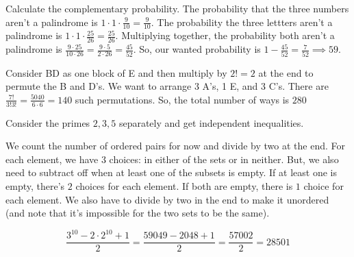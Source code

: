 \documentclass[11pt]{article}
\begin{document}
\begin{sol}
Calculate the complementary probability. The probability that the three numbers aren't a palindrome is $1\cdot 1\cdot \frac{9}{10}=\frac{9}{10}$. The probability the three lettters aren't a palindrome is $1\cdot 1\cdot \frac{25}{26}=\frac{25}{26}$. Multiplying together, the probability both aren't a palindrome is $\frac{9\cdot 25}{10\cdot 26}=\frac{9\cdot 5}{2\cdot 26}=\frac{45}{52}$. So, our wanted probability is $1-\frac{45}{52}=\frac{7}{52}\implies \boxed{59}$.
\end{sol}


\begin{sol} 
Consider BD as one block of E and then multiply by $2!=2$ at the end to permute the B and D's. We want to arrange 3 A's, 1 E, and 3 C's. There are $\frac{7!}{3!3!}=\frac{5040}{6\cdot 6}=140$ such permutations. So, the total number of ways is $\boxed{280}$
\end{sol}


\begin{sol}
 Consider the primes $2,3,5$ separately and get independent inequalities.
\end{sol}




\begin{sol} 
We count the number of ordered pairs for now and divide by two at the end. For each element, we have $3$ choices: in either of the sets or in neither. But, we also need to subtract off when at least one of the subsets is empty. If at least one is empty, there's $2$ choices for each element. If both are empty, there is $1$ choice for each element. We also have to divide by two in the end to make it unordered (and note that it's impossible for the two sets to be the same). 

$$\frac{3^{10}-2\cdot 2^{10}+1}{2} = \frac{59049-2048+1}{2}=\frac{57002}{2}=28\boxed{501}$$
\end{sol} 
\end{document}
